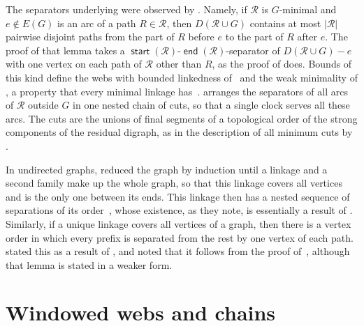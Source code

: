 \documentclass[fontsize=12pt,leading=14pt]{fullpaper}
\DeclareMathOperator{\st}{\mathsf{start}}
\DeclareMathOperator{\en}{\mathsf{end}}
\newcommand{\Rcal}{\mathcal{R}}
\begin{document}
The separators underlying  were observed by \textcite[Lemma~2.15]{KawarabayashiK15}.
Namely, if $\Rcal$ is $G$-minimal and $e\notin E(G)$ is an arc of a path $R\in\Rcal$, then $D(\Rcal\cup G)$ contains at most $|\Rcal|$ pairwise disjoint paths from the part of $R$ before $e$ to the part of $R$ after $e$.
The proof of that lemma takes a $\st(\Rcal)$-$\en(\Rcal)$-separator of $D(\Rcal\cup G)-e$ with one vertex on each path of $\Rcal$ other than $R$, as the proof of  does.
Bounds of this kind define the webs with bounded linkedness of~\cite[Definition~5.13]{KawarabayashiK15} and the weak minimality of \textcite[Definition~2.4]{HKMM26a}, a property that every minimal linkage has~\cite[Observation~2.5]{HKMM26a}.
 arranges the separators of all arcs of $\Rcal$ outside $G$ in one nested chain of cuts, so that a single clock serves all these arcs.
The cuts are the unions of final segments of a topological order of the strong components of the residual digraph, as in the description of all minimum cuts by \textcite{PicardQ80}.

In undirected graphs, \textcite[proof of~(3.1)]{LeafS15} reduced the graph by induction until a linkage and a second family make up the whole graph, so that this linkage covers all vertices and is the only one between its ends.
This linkage then has a nested sequence of separations of its order~\cite[(3.2)]{LeafS15}, whose existence, as they note, is essentially a result of \textcite[(12.1)]{RobertsonS-GMXXI}.
Similarly, if a unique linkage covers all vertices of a graph, then there is a vertex order in which every prefix is separated from the rest by one vertex of each path.
\textcite[Lemma~4.6]{CT21} stated this as a result of \textcite{RobertsonS83}, and noted that it follows from the proof of~\cite[Lemma~2.5]{RobertsonS83}, although that lemma is stated in a weaker form.


%
\section{Windowed webs and chains}\label{sec:chains}
\end{document}
